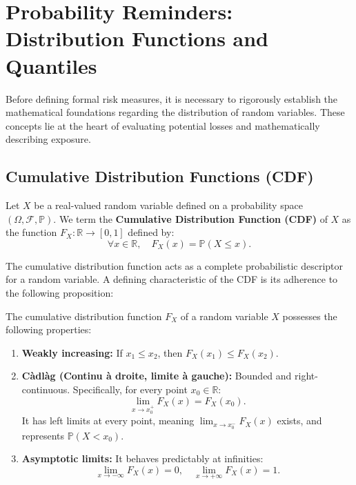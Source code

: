 \chapter{Probability Reminders: Distribution Functions and Quantiles}

Before defining formal risk measures, it is necessary to rigorously establish the mathematical foundations regarding the distribution of random variables. These concepts lie at the heart of evaluating potential losses and mathematically describing exposure.

\section{Cumulative Distribution Functions (CDF)}

\begin{definition}
Let $X$ be a real-valued random variable defined on a probability space $(\Omega, \mathcal{F}, \mathbb{P})$. We term the \textbf{Cumulative Distribution Function (CDF)} of $X$ as the function $F_X : \mathbb{R} \to [0, 1]$ defined by:
$$
\forall x \in \mathbb{R}, \quad F_X(x) = \mathbb{P}(X \leq x).
$$
\end{definition}

The cumulative distribution function acts as a complete probabilistic descriptor for a random variable. A defining characteristic of the CDF is its adherence to the following proposition:

\begin{proposition}
The cumulative distribution function $F_X$ of a random variable $X$ possesses the following properties:
\begin{enumerate}
    \item \textbf{Weakly increasing:} If $x_1 \leq x_2$, then $F_X(x_1) \leq F_X(x_2)$.
    \item \textbf{Càdlàg (Continu à droite, limite à gauche):} Bounded and right-continuous. Specifically, for every point $x_0 \in \mathbb{R}$:
    $$
    \lim_{x \to x_0^+} F_X(x) = F_X(x_0).
    $$
    It has left limits at every point, meaning $\lim_{x \to x_0^-} F_X(x)$ exists, and represents $\mathbb{P}(X < x_0)$.
    \item \textbf{Asymptotic limits:} It behaves predictably at infinities:
    $$
    \lim_{x \to -\infty} F_X(x) = 0, \quad \lim_{x \to +\infty} F_X(x) = 1.
    $$
\end{enumerate}
\end{proposition}

